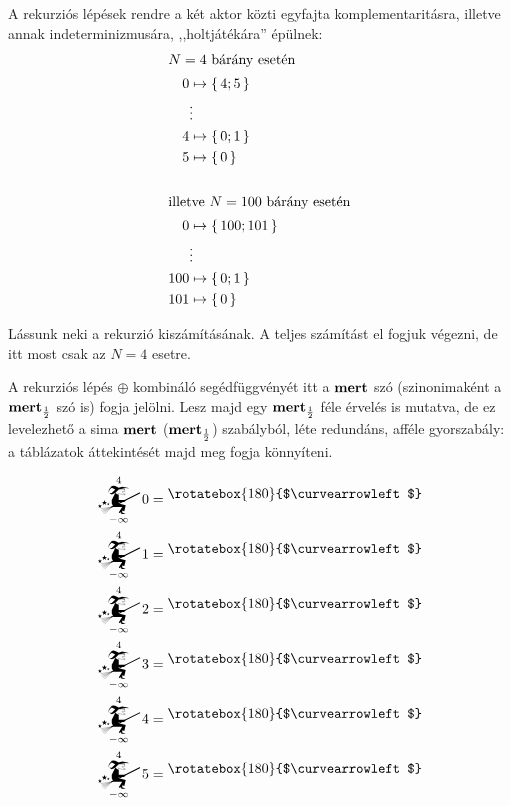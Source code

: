 \documentclass{article}
\newcommand{\nothing}{\text{\raisebox{0.4em}{\rotatebox{180}{$\curvearrowleft$}}}}%
\newcommand{\setOf}[1]{\left\lbrace\,#1\,\right\rbrace}
\newcommand{\mainfunA}[3]{\mathwitch_{#2}^{#1}#3}
\begin{document}
	A rekurziós lépések rendre a két aktor közti egyfajta komplementaritásra, illetve annak indeterminizmusára, ,,holtjátékára'' épülnek:
	\begin{align*}
		\intertext{$N = 4$ bárány esetén}
		0 &\mapsto \setOf{4; 5}\\
		&\vdots\\
		4 &\mapsto \setOf{0; 1}\\
		5 &\mapsto \setOf{0}\\
		\\\intertext{illetve $N = 100$ bárány esetén}
		0 &\mapsto \setOf{100; 101}\\
		&\vdots\\
		100 &\mapsto \setOf{0; 1}\\
		101 &\mapsto \setOf{0}
	\end{align*}

	Lássunk neki a rekurzió kiszámításának. A teljes számítást el fogjuk végezni, de itt most csak az $N = 4$ esetre.

	A rekurziós lépés $\oplus$ kombináló segédfüggvényét itt a $\text{\bf mert}$ szó (szinonimaként a $\text{\bf mert}_\frac12$ szó is) fogja jelölni. Lesz majd egy $\text{\bf mert}_\frac12$ féle érvelés is mutatva, de ez levelezhető a sima $\text{\bf mert}$ ($\text{\bf mert}_\frac12$) szabályból, léte redundáns, afféle gyorszabály: a táblázatok áttekintését majd meg fogja könnyíteni.

	
	\begin{align*}
		\mainfunA4{-\infty}0 &= \nothing \\
		\mainfunA4{-\infty}1 &= \nothing \\
		\mainfunA4{-\infty}2 &= \nothing \\
		\mainfunA4{-\infty}3 &= \nothing \\
		\mainfunA4{-\infty}4 &= \nothing \\
		\mainfunA4{-\infty}5 &= \nothing
	\end{align*}
\end{document}
